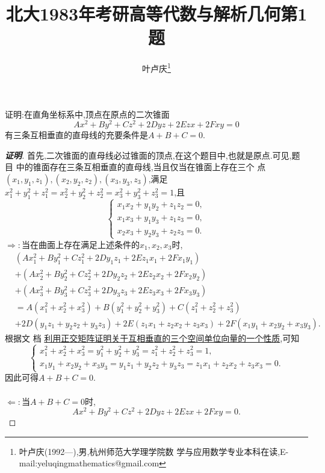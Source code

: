 \documentclass[a4paper]{article}
\begin{document}
\title{\huge{\bf{北大1983年考研高等代数与解析几何第1题}}}
\author{\small{叶卢庆\footnote{叶卢庆(1992---),男,杭州师范大学理学院数
      学与应用数学专业本科在读,E-mail:yeluqingmathematics@gmail.com}}}
\maketitle
\begin{exercise}
  证明:在直角坐标系中,顶点在原点的二次锥面
$$
Ax^2+By^2+Cz^2+2Dyz+2Ezx+2Fxy=0
$$
有三条互相垂直的直母线的充要条件是$A+B+C=0$.
\end{exercise}
\begin{proof}[\textbf{证明}]
  首先,二次锥面的直母线必过锥面的顶点,在这个题目中,也就是原点.可见,题目
  中的锥面存在三条互相垂直的直母线,当且仅当在锥面上存在三个
  点$(x_1,y_1,z_1),(x_2,y_2,z_2),(x_3,y_3,z_3)$,满足
  $x_1^2+y_1^2+z_1^2=x_2^2+y_2^2+z_2^2=x_3^2+y_3^2+z_3^2=1$,且
$$
\begin{cases}
  x_1x_2+y_1y_2+z_1z_{2}=0,\\
  x_1x_3+y_1y_3+z_1z_3=0,\\
  x_2x_3+y_2y_3+z_2z_3=0.
\end{cases}
$$
$\Rightarrow:$当在曲面上存在满足上述条件的$x_1,x_2,x_3$时,
\begin{align*}
  &(Ax_{1}^2+By_{1}^2+Cz_{1}^2+2Dy_{1}z_{1}+2Ez_{1}x_{1}+2Fx_{1}y_{1})
  \\&+(Ax_{2}^2+By_{2}^2+Cz_{2}^2+2Dy_{2}z_{2}+2Ez_{2}x_{2}+2Fx_{2}y_2)
  \\&+(Ax_{3}^2+By_{3}^2+Cz_{3}^2+2Dy_{3}z_{3}+2Ez_{3}x_{3}+2Fx_{3}y_3)
  \\&=A(x_1^2+x_2^2+x_3^2)+B(y_1^2+y_2^2+y_3^2)+C(z_1^2+z_2^2+z_3^2)
  \\&+2D(y_1z_1+y_2z_2+y_3z_3)+2E(z_1x_1+z_2x_2+z_3x_3)+2F(x_1y_1+x_2y_2+x_3y_3).
\end{align*}
根据文
档
\href{http://blog.sciencenet.cn/home.php?mod=space&uid=604208&do=blog&id=846994}{
  利用正交矩阵证明关于互相垂直的三个空间单位向量的一个性质},可知
$$
\begin{cases}
  x_1^2+x_2^2+x_3^2=y_1^2+y_2^2+y_3^2=z_1^2+z_2^2+z_3^2=1,\\
  x_1y_1+x_2y_2+x_3y_3=y_1z_1+y_2z_2+y_3z_3=z_1x_1+z_2x_2+z_3x_3=0.
\end{cases}
$$
因此可得$A+B+C=0$.\\\\
$\Leftarrow:$当$A+B+C=0$时,
\begin{equation}
  \label{eq:1}
  Ax^2+By^2+Cz^2+2Dyz+2Ezx+2Fxy=0.
\end{equation}

\end{proof}
\end{document}
